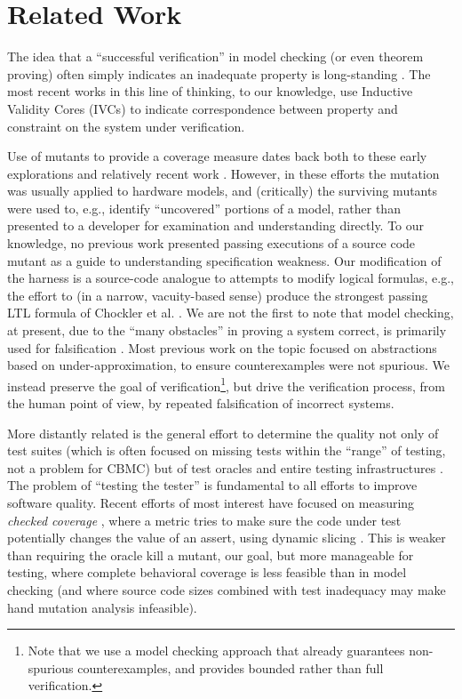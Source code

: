 \documentclass{svjour3}
\begin{document}
\section{Related Work}

The idea that a ``successful verification'' in model checking (or even
 theorem proving) often simply indicates an inadequate property is
long-standing \cite{PracticalCov,Hoskote}. The most recent works in
this line of thinking, to our knowledge, use Inductive Validity Cores
(IVCs) \cite{WhalenIVC1,WhalenIVC2,WhalenIVC3} to indicate correspondence between property
and constraint on the system under verification.

Use of mutants \cite{MutSpec,MutCov} to provide a coverage measure dates back both to
these early explorations and relatively recent work \cite{MutTheory,Arbiters,MutInterp}.
However, in these efforts the mutation was usually applied to hardware
models, and (critically) the surviving mutants were used to, e.g., identify
``uncovered'' portions of a model, rather than presented to a
developer for examination and understanding directly.  To our
knowledge, no previous work presented passing executions of a source
code mutant as a guide to understanding specification weakness.  Our
modification of the harness is a source-code analogue to attempts to
modify logical formulas, e.g., the effort to (in a narrow,
vacuity-based sense) produce the strongest passing LTL formula
of Chockler et al. \cite{BeyondVac}.  We are not the first to note
that model checking, at present, due to the ``many obstacles'' in
proving a system correct, is primarily used for falsification
\cite{AbsFals}.  Most previous work on the topic \cite{AbsFals} focused on
abstractions based on under-approximation, to ensure counterexamples
were not spurious. We instead preserve the goal of
verification\footnote{Note that we use a model checking approach that
  already guarantees non-spurious counterexamples, and provides
  bounded rather than full verification.}, but drive the verification
process, from the human point of view, by repeated falsification of
incorrect systems.

More distantly related is the general effort to determine the quality
not only of test suites (which is often focused on missing tests
within the ``range'' of testing, not a problem for CBMC) but of test
oracles and entire testing infrastructures \cite{oracleMcMinn}.  The problem of ``testing
the tester'' \cite{WODA09} is fundamental to all efforts
to improve software quality.  Recent efforts of most interest have
focused on measuring \emph{checked coverage} \cite{CheckedCov,CheckedJournal,ThereYet}, where
a metric tries to make sure the code under test potentially changes
the value of an assert, using dynamic slicing \cite{DynSlice,Tip}.  This is weaker than requiring the oracle kill
a mutant, our goal, but more manageable for testing, where complete
behavioral coverage is less feasible than in model checking (and where
source code sizes combined with test inadequacy may make hand mutation analysis infeasible).
\end{document}
